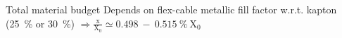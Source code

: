 \documentclass{beamer}
\begin{document}
\begin{frame}
\begin{columns}[c]
\begin{column}{5cm}
      \end{column}
    \end{columns}

    \begin{block}{Total material budget}
      \centering 
      Depends on flex-cable  metallic fill factor w.r.t. kapton (25~\% or 30~\%)
      $\Rightarrow \frac{\text{x}}{\text{X}_0} \simeq 0.498~-~0.515~\%~\text{X}_0$
      \\
    \end{block}
  \end{frame}
\end{document}
